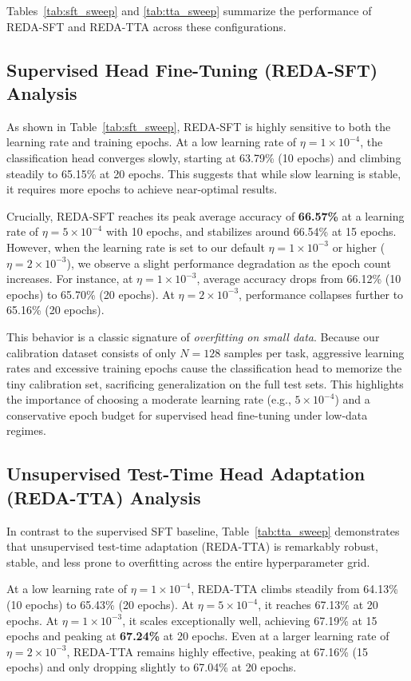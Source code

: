 \documentclass{article}
\theoremstyle{plain}
\theoremstyle{definition}
\theoremstyle{remark}
\begin{document}
Tables~\ref{tab:sft_sweep} and \ref{tab:tta_sweep} summarize the performance of REDA-SFT and REDA-TTA across these configurations.

\subsection{Supervised Head Fine-Tuning (REDA-SFT) Analysis}
As shown in Table~\ref{tab:sft_sweep}, REDA-SFT is highly sensitive to both the learning rate and training epochs.
At a low learning rate of $\eta = 1\times10^{-4}$, the classification head converges slowly, starting at 63.79\% (10 epochs) and climbing steadily to 65.15\% at 20 epochs. This suggests that while slow learning is stable, it requires more epochs to achieve near-optimal results.

Crucially, REDA-SFT reaches its peak average accuracy of \textbf{66.57\%} at a learning rate of $\eta = 5\times10^{-4}$ with 10 epochs, and stabilizes around 66.54\% at 15 epochs. 
However, when the learning rate is set to our default $\eta = 1\times10^{-3}$ or higher ($\eta = 2\times10^{-3}$), we observe a slight performance degradation as the epoch count increases. For instance, at $\eta = 1\times10^{-3}$, average accuracy drops from 66.12\% (10 epochs) to 65.70\% (20 epochs). At $\eta = 2\times10^{-3}$, performance collapses further to 65.16\% (20 epochs).

This behavior is a classic signature of \textit{overfitting on small data}. Because our calibration dataset consists of only $N=128$ samples per task, aggressive learning rates and excessive training epochs cause the classification head to memorize the tiny calibration set, sacrificing generalization on the full test sets. This highlights the importance of choosing a moderate learning rate (e.g., $5\times10^{-4}$) and a conservative epoch budget for supervised head fine-tuning under low-data regimes.

\subsection{Unsupervised Test-Time Head Adaptation (REDA-TTA) Analysis}
In contrast to the supervised SFT baseline, Table~\ref{tab:tta_sweep} demonstrates that unsupervised test-time adaptation (REDA-TTA) is remarkably robust, stable, and less prone to overfitting across the entire hyperparameter grid.

At a low learning rate of $\eta = 1\times10^{-4}$, REDA-TTA climbs steadily from 64.13\% (10 epochs) to 65.43\% (20 epochs). 
At $\eta = 5\times10^{-4}$, it reaches 67.13\% at 20 epochs.
At $\eta = 1\times10^{-3}$, it scales exceptionally well, achieving 67.19\% at 15 epochs and peaking at \textbf{67.24\%} at 20 epochs.
Even at a larger learning rate of $\eta = 2\times10^{-3}$, REDA-TTA remains highly effective, peaking at 67.16\% (15 epochs) and only dropping slightly to 67.04\% at 20 epochs.
\end{document}
